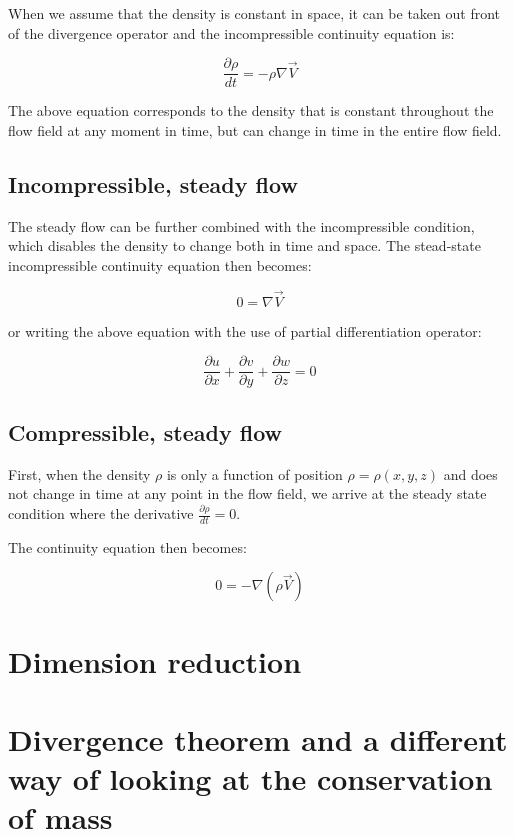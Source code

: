 When we assume that the density is constant in space, it can be taken out front of the divergence operator and the incompressible continuity equation is:

\begin{equation} \label{eq:continuity_incompressible}
\frac{\partial \rho}{dt} = - \rho \nabla \vec{V}
\end{equation}

The above equation corresponds to the density that is constant throughout the flow field at any moment in time, but can change in time in the entire flow field.




\subsection{Incompressible, steady flow}

The steady flow can be further combined with the incompressible condition, which disables the density to change both in time and space. The stead-state incompressible continuity equation then becomes:

\begin{equation} \label{eq:continuity_stst_incompressible}
0 = \nabla \vec{V}
\end{equation}

or writing the above equation with the use of partial differentiation operator:

\begin{equation}
\frac{\partial u}{\partial x} + \frac{\partial v}{\partial y} + \frac{\partial w}{\partial z} = 0
\end{equation}


\subsection{Compressible, steady flow}

First, when the density $\rho$ is only a function of position $\rho = \rho(x,y,z)$ and does not change in time at any point in the flow field, we arrive at the steady state condition where the derivative $\frac{\partial \rho}{dt} = 0$.

The continuity equation then becomes:

\begin{equation} \label{eq:continuity_stst}
0 = - \nabla (\rho  \vec{V})
\end{equation}



\section{Dimension reduction}




\section{Divergence theorem and a different way of looking at the conservation of mass}